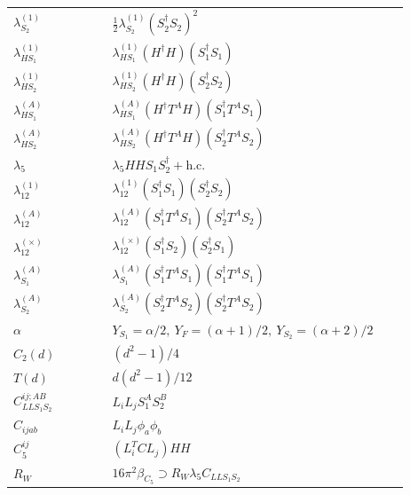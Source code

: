 \documentclass[8pt]{article}
\begin{document}
\begin{landscape}
\begin{longtable}{@{}p{0.23\linewidth}p{0.69\linewidth}@{}}
$\lambda_{S_2}^{(1)}$ & $\frac12\lambda_{S_2}^{(1)}(S_2^\dagger S_2)^2$ \\
$\lambda_{HS_1}^{(1)}$ & $\lambda_{HS_1}^{(1)}(H^\dagger H)(S_1^\dagger S_1)$ \\
$\lambda_{HS_2}^{(1)}$ & $\lambda_{HS_2}^{(1)}(H^\dagger H)(S_2^\dagger S_2)$ \\
$\lambda_{HS_1}^{(A)}$ & $\lambda_{HS_1}^{(A)}(H^\dagger T^AH)(S_1^\dagger T^AS_1)$ \\
$\lambda_{HS_2}^{(A)}$ & $\lambda_{HS_2}^{(A)}(H^\dagger T^AH)(S_2^\dagger T^AS_2)$ \\
$\lambda_5$ & $\lambda_5HHS_1S_2^\dagger+\mathrm{h.c.}$ \\
$\lambda_{12}^{(1)}$ & $\lambda_{12}^{(1)}(S_1^\dagger S_1)(S_2^\dagger S_2)$ \\
$\lambda_{12}^{(A)}$ & $\lambda_{12}^{(A)}(S_1^\dagger T^AS_1)(S_2^\dagger T^AS_2)$ \\
$\lambda_{12}^{(\times)}$ & $\lambda_{12}^{(\times)}(S_1^\dagger S_2)(S_2^\dagger S_1)$ \\
$\lambda_{S_1}^{(A)}$ & $\lambda_{S_1}^{(A)}(S_1^\dagger T^A S_1)(S_1^\dagger T^A S_1)$ \\
$\lambda_{S_2}^{(A)}$ & $\lambda_{S_2}^{(A)}(S_2^\dagger T^A S_2)(S_2^\dagger T^A S_2)$ \\
$\alpha$ & $Y_{S_1}=\alpha/2,\ Y_F=(\alpha+1)/2,\ Y_{S_2}=(\alpha+2)/2$ \\
$C_2(d)$ & $(d^2-1)/4$ \\
$T(d)$ & $d(d^2-1)/12$ \\
$C_{LLS_1S_2}^{ij;AB}$ & $L_iL_jS_1^AS_2^B$ \\
$C_{ijab}$ & $L_iL_j\phi_a\phi_b$ \\
$C_5^{ij}$ & $(L_i^TCL_j)HH$ \\
$R_W$ & $16\pi^2\beta_{C_5}\supset R_W\lambda_5C_{LLS_1S_2}$ \\
\bottomrule
\end{longtable}

\end{landscape}
\end{document}
